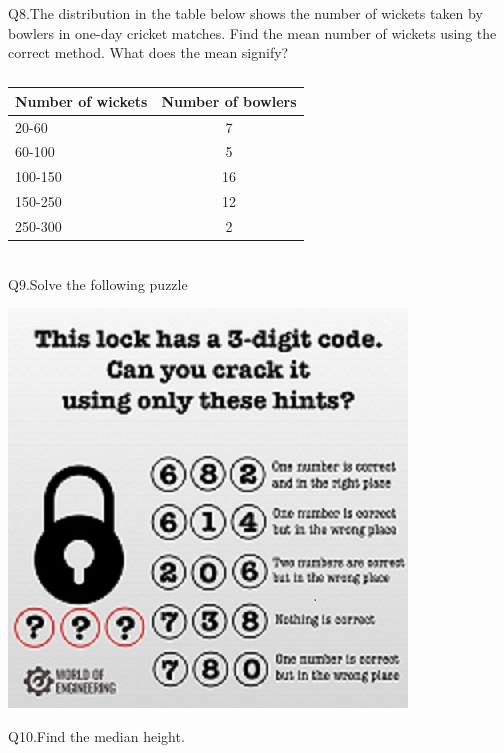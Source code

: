 \documentclass[12pt]{article}
\begin{document}
Q8.The distribution in the table below shows the number of wickets taken by bowlers in one-day cricket matches. Find the mean number of wickets using the correct method. What does the mean signify?
\begin{table}[h!]
	\begin{center}
		\caption{}
		\begin{tabular}{l|c} 
			\textbf{Number of wickets} & \textbf{Number of bowlers}\\
			\hline
			20-60 & 7\\
			60-100 &5\\
			100-150 & 16\\
			150-250 & 12\\
			250-300&2\\
			
			
		\end{tabular}
	\end{center}
\end{table}\\
\newpage
Q9.Solve the following puzzle
\vspace{1cm}
\begin{center}
	
	\includegraphics{puzzle.jpg}\\
	
	\label{puzzle}
\end{center}
\vspace{1.5cm}
Q10.Find the median height.
\end{document}

